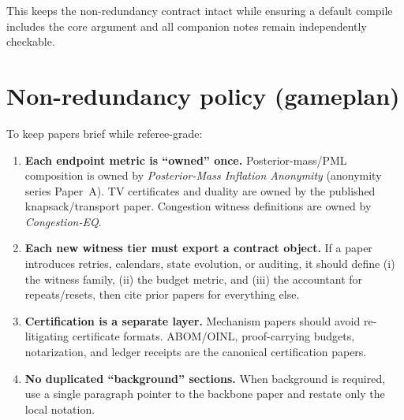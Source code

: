 \documentclass[11pt]{article}
\begin{document}
This keeps the non-redundancy contract intact while ensuring a default compile includes the core argument and all companion notes remain independently checkable.

\section{Non-redundancy policy (gameplan)}
To keep papers brief while referee-grade:
\begin{enumerate}[leftmargin=*]
\item \textbf{Each endpoint metric is ``owned'' once.}
  Posterior-mass/PML composition is owned by \emph{Posterior-Mass Inflation Anonymity} (anonymity series Paper~A).
  TV certificates and duality are owned by the published knapsack/transport paper.
  Congestion witness definitions are owned by \emph{Congestion-EQ}.
\item \textbf{Each new witness tier must export a contract object.}
  If a paper introduces retries, calendars, state evolution, or auditing, it should define (i) the witness family, (ii) the budget metric, and (iii) the accountant for repeats/resets,
  then cite prior papers for everything else.
\item \textbf{Certification is a separate layer.}
  Mechanism papers should avoid re-litigating certificate formats.
  ABOM/OINL, proof-carrying budgets, notarization, and ledger receipts are the canonical certification papers.
\item \textbf{No duplicated ``background'' sections.}
  When background is required, use a single paragraph pointer to the backbone paper and restate only the local notation.
\end{enumerate}
\end{document}
